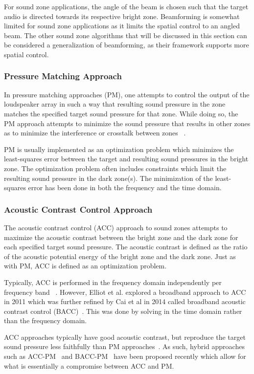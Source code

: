 For sound zone applications, the angle of the beam is chosen such that the target audio is directed towards its respective bright zone.
Beamforming is somewhat limited for sound zone applications as it limits the spatial control to an angled beam.
The other sound zone algorithms that will be discussed in this section can be considered a generalization of beamforming, as their framework supports more
spatial control.

\subsubsection{Pressure Matching Approach}
In pressure matching approaches (PM), one attempts to control the output of the loudspeaker array in such a way that resulting sound pressure in the zone 
matches the specified target sound pressure for that zone.
While doing so, the PM approach attempts to minimize the sound pressure that results in other zones as to minimize the interference or crosstalk between zones
~\cite{olik2013comparative, betlehem2015personal}.

PM is usually implemented as an optimization problem which minimizes the least-squares error between the target and resulting sound pressures in the bright zone.
The optimization problem often includes constraints which limit the resulting sound pressure in the dark zone(s).
The minimization of the least-squares error has been done in both the frequency and the time domain.


\subsubsection{Acoustic Contrast Control Approach}
The acoustic contrast control (ACC) approach to sound zones attempts to maximize the acoustic contrast between the bright zone and the dark zone for 
each specified target sound pressure.
The acoustic contrast is defined as the ratio of the acoustic potential energy of the bright zone and the dark zone.
Just as with PM, ACC is defined as an optimization problem.

Typically, ACC is performed in the frequency domain independently per frequency band ~\cite{olik2013comparative, betlehem2015personal}.
However, Elliot et al. explored a broadband approach to ACC in 2011 which was further refined by Cai et al in 2014 called broadband acoustic contrast control 
(BACC)~\cite{elliott2011regularisation, cai2014time}.
This was done by solving in the time domain rather than the frequency domain.

ACC approaches typically have good acoustic contrast, but reproduce the target sound pressure less faithfully than PM approaches~\cite{lee2020signal}.
As such, hybrid approaches such as ACC-PM~\cite{galvez2015time} and BACC-PM~\cite{lee2018unified} have been proposed recently which allow for what is
essentially a compromise between ACC and PM.
